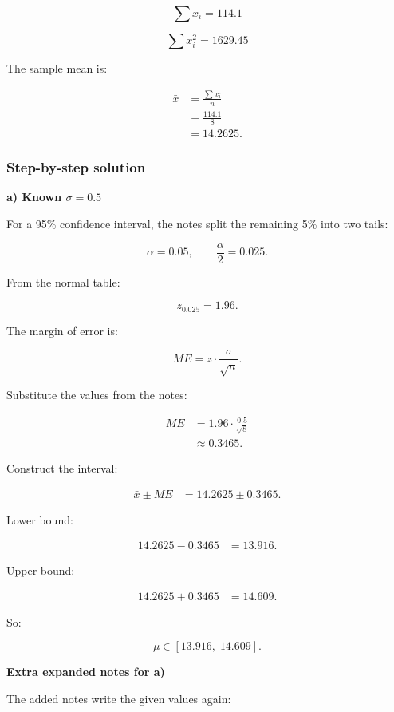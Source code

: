 \documentclass[10pt]{article}
\begin{document}
\[
\sum x_i=114.1
\]

\[
\sum x_i^2=1629.45
\]

The sample mean is:

\begin{align*}
\bar{x}
&=\frac{\sum x_i}{n} \\[2mm]
&=\frac{114.1}{8} \\[2mm]
&=14.2625.
\end{align*}

\subsubsection*{Step-by-step solution}

\textbf{a) Known \(\sigma=0.5\)}

For a 95\% confidence interval, the notes split
the remaining 5\% into two tails:

\[
\alpha=0.05,
\qquad
\frac{\alpha}{2}=0.025.
\]

From the normal table:

\[
z_{0.025}=1.96.
\]

The margin of error is:

\[
ME=z\cdot \frac{\sigma}{\sqrt{n}}.
\]

Substitute the values from the notes:

\begin{align*}
ME
&=1.96\cdot \frac{0.5}{\sqrt{8}} \\[2mm]
&\approx 0.3465.
\end{align*}

Construct the interval:

\begin{align*}
\bar{x}\pm ME
&=14.2625\pm 0.3465.
\end{align*}

Lower bound:

\begin{align*}
14.2625-0.3465
&=13.916.
\end{align*}

Upper bound:

\begin{align*}
14.2625+0.3465
&=14.609.
\end{align*}

So:

\[
\mu\in [13.916,\;14.609].
\]

\textbf{Extra expanded notes for a)}

The added notes write the given values again:
\end{document}
